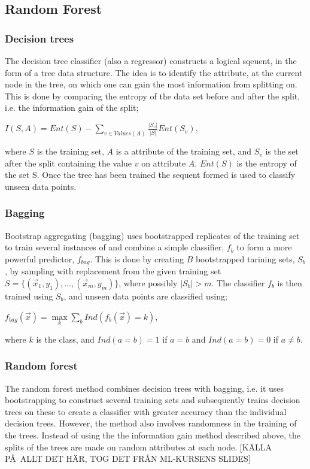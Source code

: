 \documentclass{article}
\begin{document}
\subsection{Random Forest}
\subsubsection{Decision trees}
The decision tree classifier (also a regressor) constructs a logical sqeuent, in the form of a tree data structure. The idea is to identify the attribute, at the current node in the tree, on which one can gain the most information from splitting on. This is done by comparing the entropy of the data set before and after the split, i.e. the information gain of the split;
\begin{center}
$I(S, A) = Ent(S) - \sum\limits_{v \in Values(A)} \frac{|S_v|}{|S|} Ent(S_v),$
\end{center}
where $S$ is the training set, $A$ is a attribute of the training set, and $S_v$ is the set after the split containing the value $v$ on attribute $A$. $Ent(S)$ is the entropy of the set S. Once the tree has been trained the sequent formed is used to classify unseen data points.
\subsubsection{Bagging}
Bootstrap aggregating (bagging) uses bootstrapped replicates of the training set to train several instances of and combine a simple classifier, $f_b$ to form a more powerful predictor, $f_{bag}$. This is done by creating $B$ bootstrapped tarining sets, $S_b$, by sampling with replacement from the given training set $S = \{ (\vec{x}_1, y_1), ..., (\vec{x}_m, y_m)\}$, where possibly $|S_b| > m$. The classifier $f_b$ is then trained using $S_b$, and unseen data points are classified using; 
\begin{center}
$f_{bag}(\vec{x}) = \max\limits_k \sum\limits_b Ind(f_b(\vec{x}) = k)$,
\end{center}
where $k$ is the class, and $Ind(a = b) = 1$ if $a = b$ and $Ind(a = b) = 0$ if $a \ne b$.

\subsubsection{Random forest}
The random forest method combines decision trees with bagging, i.e. it uses bootstrapping to construct several training sets and subsequently trains decision trees on these to create a classifier with greater accuracy than the individual decision trees. However, the method also involves randomness in the training of the trees. Instead of using the the information gain method described above, the splits of the trees are made on random attributes at each node.  [K\"ALLA P\AA\ ALLT DET H\"AR, TOG DET FR\AA N ML-KURSENS SLIDES]
\end{document}
